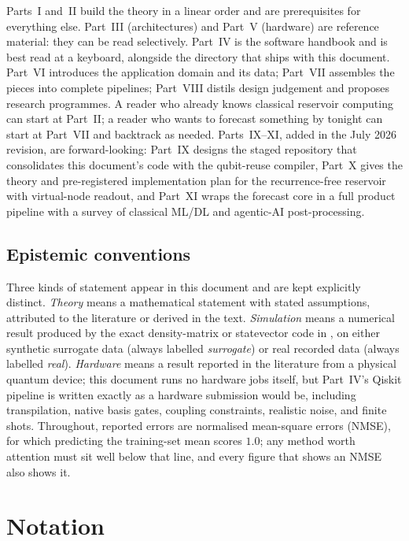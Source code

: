 Parts~I and~II build the theory in a linear order and are prerequisites for
everything else. Part~III (architectures) and Part~V (hardware) are reference
material: they can be read selectively. Part~IV is the software handbook and is
best read at a keyboard, alongside the  directory that ships with
this document. Part~VI introduces the application domain and its data; Part~VII
assembles the pieces into complete pipelines; Part~VIII distils design judgement
and proposes research programmes. A reader who already knows classical reservoir
computing can start at Part~II; a reader who wants to forecast something by
tonight can start at Part~VII and backtrack as needed. Parts~IX--XI, added in
the July 2026 revision, are forward-looking: Part~IX designs the staged
repository that consolidates this document's code with the qubit-reuse
compiler, Part~X gives the theory and pre-registered implementation plan for
the recurrence-free reservoir with virtual-node readout, and Part~XI wraps
the forecast core in a full product pipeline with a survey of classical
ML/DL and agentic-AI post-processing.

\subsection*{Epistemic conventions}

Three kinds of statement appear in this document and are kept explicitly
distinct. \emph{Theory} means a mathematical statement with stated assumptions,
attributed to the literature or derived in the text. \emph{Simulation} means a
numerical result produced by the exact density-matrix or statevector code in
, on either synthetic surrogate data (always labelled
\emph{surrogate}) or real recorded data (always labelled \emph{real}).
\emph{Hardware} means a result reported in the literature from a physical
quantum device; this document runs no hardware jobs itself, but Part~IV's Qiskit
pipeline is written exactly as a hardware submission would be, including
transpilation, native basis gates, coupling constraints, realistic noise, and
finite shots. Throughout, reported errors are normalised mean-square errors
(NMSE), for which predicting the training-set mean scores $1.0$; any method
worth attention must sit well below that line, and every figure that shows an
NMSE also shows it.

\clearpage
\tableofcontents

\clearpage
\section*{Notation}


